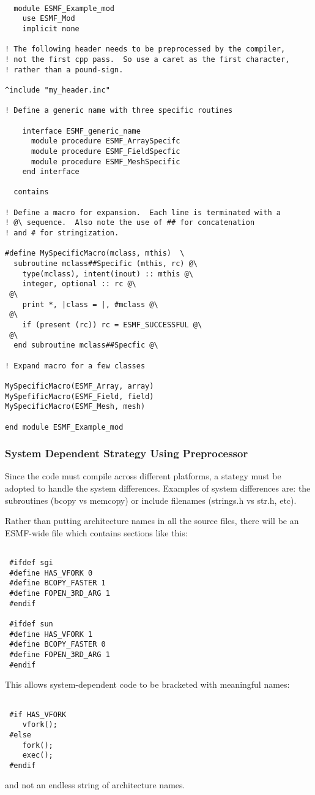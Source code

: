 \begin{verbatim}

  module ESMF_Example_mod
    use ESMF_Mod
    implicit none

! The following header needs to be preprocessed by the compiler,
! not the first cpp pass.  So use a caret as the first character,
! rather than a pound-sign.

^include "my_header.inc"

! Define a generic name with three specific routines

    interface ESMF_generic_name
      module procedure ESMF_ArraySpecifc
      module procedure ESMF_FieldSpecfic
      module procedure ESMF_MeshSpecific
    end interface

  contains

! Define a macro for expansion.  Each line is terminated with a
! @\ sequence.  Also note the use of ## for concatenation
! and # for stringization.

#define MySpecificMacro(mclass, mthis)  \
  subroutine mclass##Specific (mthis, rc) @\
    type(mclass), intent(inout) :: mthis @\
    integer, optional :: rc @\
 @\
    print *, |class = |, #mclass @\
 @\
    if (present (rc)) rc = ESMF_SUCCESSFUL @\
 @\
  end subroutine mclass##Specfic @\

! Expand macro for a few classes

MySpecificMacro(ESMF_Array, array)
MySpefificMacro(ESMF_Field, field)
MySpecificMacro(ESMF_Mesh, mesh)

end module ESMF_Example_mod

\end{verbatim}

\subsubsection{System Dependent Strategy Using Preprocessor} Since the code
must compile across different platforms, a stategy must be adopted to
handle the system differences. Examples of system differences are: the
subroutines (bcopy vs memcopy) or include filenames (strings.h vs str.h,
etc).

Rather than putting architecture names in all the source files, there will
be an ESMF-wide file which contains sections like this: 
\begin{verbatim}

 #ifdef sgi 
 #define HAS_VFORK 0 
 #define BCOPY_FASTER 1 
 #define FOPEN_3RD_ARG 1 
 #endif

 #ifdef sun 
 #define HAS_VFORK 1 
 #define BCOPY_FASTER 0 
 #define FOPEN_3RD_ARG 1 
 #endif

\end{verbatim} This allows system-dependent code to be bracketed with
meaningful names: 

\begin{verbatim} 

 #if HAS_VFORK
    vfork();
 #else
    fork(); 
    exec();
 #endif

\end{verbatim} 
and not an endless string of architecture names.


